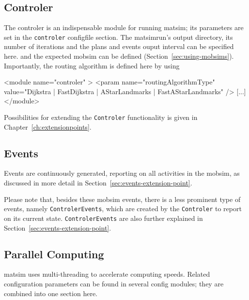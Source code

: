 \subsection{Controler}
\label{sec:using-controler}
The controler is an indispensable module for running \gls{matsim}; its parameters are set in the \lstinline|controler| \gls{configfile} section. The \gls{matsimrun}'s output directory, its number of iterations and the plans and events ouput interval can be specified here. and the expected \gls{mobsim} can be defined (Section~\ref{sec:using-mobsims}). Importantly, the routing algorithm is defined here by using
%
\begin{xml}
<module name="controler" >
    <param name="routingAlgorithmType" value="{Dijkstra | FastDijkstra |
    		AStarLandmarks | FastAStarLandmarks}" />
    [...]
</module>
\end{xml}
%
Possibilities for extending the \lstinline|Controler| functionality is given in %
Chapter~\ref{ch:extensionpoints}.

\subsection{Events}
\label{sec:using-events}
Events are continuously generated, reporting on all activities in the \gls{mobsim}, as discussed in more detail in Section~\ref{sec:events-extension-point}. 

Please note that, besides these \gls{mobsim} events, there is a less prominent type of events, namely \lstinline|ControlerEvents|, which are created by the \lstinline|Controler| to report on its current state. \lstinline|ControlerEvents| are also further explained in Section~\ref{sec:events-extension-point}. 
% 

\subsection{Parallel Computing}
\label{sec:using-parallel-computing}

\gls{matsim} uses multi-threading to accelerate computing speeds.  Related configuration parameters can be found in several config modules; they are combined into one section here.

